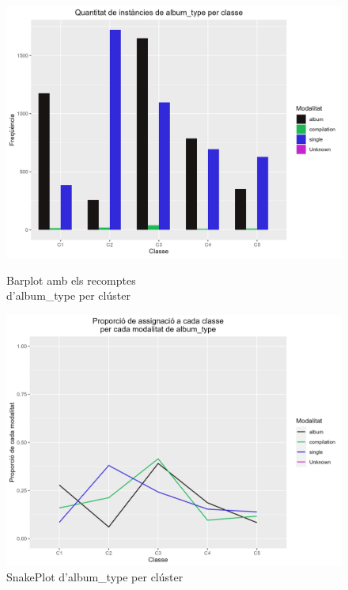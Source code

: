 \begin{figure}[H]
\centering
    \begin{minipage}{.49\textwidth}
        \centering
        \includegraphics[width=0.95\linewidth]{Images/5_Profiling/categoriques/cat/Cat_BarPlot_album_type.png}
        \caption{Barplot amb els recomptes \\ d'album\_type per clúster}
        \label{fig:Cat_BarPlot_album_type}
    \end{minipage}%
    \begin{minipage}{.49\textwidth}
        \centering
        \includegraphics[width=0.95\linewidth]{Images/5_Profiling/categoriques/cat/Cat_SnakePlot_album_type.png}
        \caption{SnakePlot d'album\_type per clúster}
        \label{fig:Cat_SnakePlot_album_type}
    \end{minipage}%
\end{figure}

